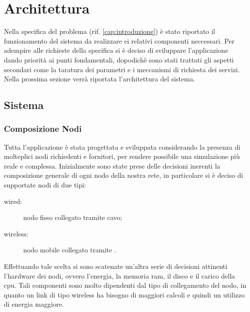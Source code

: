 \chapter{Architettura}\label{cap:architettura}
Nella specifica del problema (rif. \ref{cap:introduzione}) è stato riportato il funzionamento del sistema da realizzare ei relativi componenti neccessari. Per adempire alle richieste della specifica si è deciso di sviluppare l'applicazione dando priorità ai punti fondamentali, dopodichè sono stati trattati gli aspetti secondari come la taratura dei parametri e i meccanismi di richiesta dei servizi. Nella prossima sezione verrà riportata l'architettura del sistema.
\section{Sistema}
\subsection{Composizione Nodi}
Tutta l'applicazione è stata progettata e sviluppata considerando la presenza di molteplici nodi richiedenti e fornitori, per rendere possibile una simulazione più reale e complessa. Inizialmente sono state prese delle decisioni inerenti la composizione generale di ogni nodo della nostra rete, in particolare si è deciso di supportate nodi di due tipi:
\begin{description}
\item[wired:] nodo fisso collegato tramite cavo;
\item[wireless:] nodo mobile collegato tramite .
\end{description}
Effettuando tale scelta si sono scatenate un'altra serie di decisioni attinenti l'hardware dei nodi, ovvero l'energia, la memoria ram, il disco e il carico della cpu. Tali componenti sono molto dipendenti dal tipo di collegamento del nodo, in quanto un link di tipo wireless ha bisogno di maggiori calcoli e quindi un utilizzo di energia maggiore.
